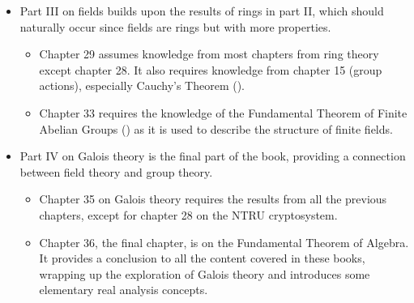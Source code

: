 \begin{itemize}
\begin{itemize}
    \end{itemize}
    \item Part III on fields builds upon the results of rings in part II, which should naturally occur since fields are rings but with more properties.
    \begin{itemize}
        \item Chapter 29 assumes knowledge from most chapters from ring theory except chapter 28. It also requires knowledge from chapter 15 (group actions), especially Cauchy's Theorem ().
        \item Chapter 33 requires the knowledge of the Fundamental Theorem of Finite Abelian Groups () as it is used to describe the structure of finite fields.
    \end{itemize}
    \item Part IV on Galois theory is the final part of the book, providing a connection between field theory and group theory.
    \begin{itemize}
        \item Chapter 35 on Galois theory requires the results from all the previous chapters, except for chapter 28 on the NTRU cryptosystem.
        \item Chapter 36, the final chapter, is on the Fundamental Theorem of Algebra. It provides a conclusion to all the content covered in these books, wrapping up the exploration of Galois theory and introduces some elementary real analysis concepts.
    \end{itemize}
\end{itemize}
